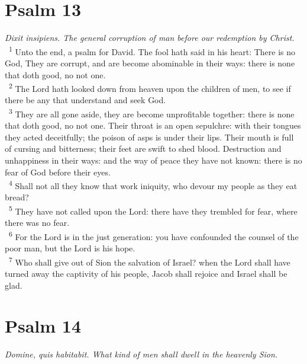 \documentclass[a5paper,12pt]{article}
\begin{document}
\begin{multicols*}{2}
\section{Psalm 13}
\label{sec:org71e3231}
\emph{Dixit insipiens. The general corruption of man before our redemption by Christ.}\\

~\textsuperscript{1} Unto the end, a psalm for David. The fool hath said in his heart: There is no God, They are corrupt, and are become abominable in their ways: there is none that doth good, no not one.\\
~\textsuperscript{2} The Lord hath looked down from heaven upon the children of men, to see if there be any that understand and seek God.\\
~\textsuperscript{3} They are all gone aside, they are become unprofitable together: there is none that doth good, no not one. Their throat is an open sepulchre: with their tongues they acted deceitfully; the poison of asps is under their lips. Their mouth is full of cursing and bitterness; their feet are swift to shed blood. Destruction and unhappiness in their ways: and the way of peace they have not known: there is no fear of God before their eyes.\\
~\textsuperscript{4} Shall not all they know that work iniquity, who devour my people as they eat bread?\\
~\textsuperscript{5} They have not called upon the Lord: there have they trembled for fear, where there was no fear.\\
~\textsuperscript{6} For the Lord is in the just generation: you have confounded the counsel of the poor man, but the Lord is his hope.\\
~\textsuperscript{7} Who shall give out of Sion the salvation of Israel? when the Lord shall have turned away the captivity of his people, Jacob shall rejoice and Israel shall be glad.\\

\section{Psalm 14}
\label{sec:orga7b603e}
\emph{Domine, quis habitabit. What kind of men shall dwell in the heavenly Sion.}\\


\end{multicols*}
\end{document}
